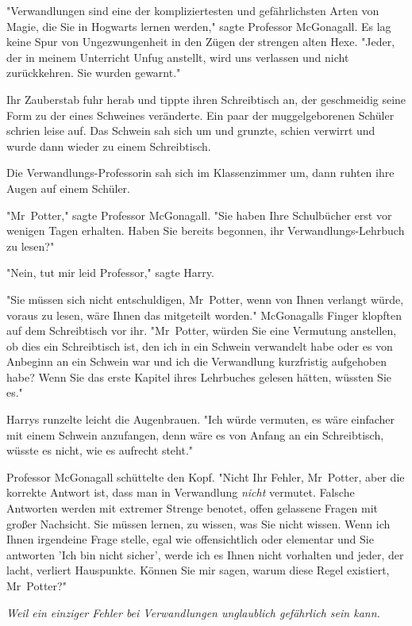 {\later

"Verwandlungen sind eine der kompliziertesten und gefährlichsten Arten von Magie, die Sie in Hogwarts lernen werden," sagte Professor McGonagall. Es lag keine Spur von Ungezwungenheit in den Zügen der strengen alten Hexe. "Jeder, der in meinem Unterricht Unfug anstellt, wird uns verlassen und nicht zurückkehren. Sie wurden gewarnt."

Ihr Zauberstab fuhr herab und tippte ihren Schreibtisch an, der geschmeidig seine Form zu der eines Schweines veränderte. Ein paar der muggelgeborenen Schüler schrien leise auf. Das Schwein sah sich um und grunzte, schien verwirrt und wurde dann wieder zu einem Schreibtisch.

Die Verwandlungs-Professorin sah sich im Klassenzimmer um, dann ruhten ihre Augen auf einem Schüler.

"Mr~Potter," sagte Professor McGonagall. "Sie haben Ihre Schulbücher erst vor wenigen Tagen erhalten. Haben Sie bereits begonnen, ihr Verwandlungs-Lehrbuch zu lesen?"

"Nein, tut mir leid Professor," sagte Harry.

"Sie müssen sich nicht entschuldigen, Mr~Potter, wenn von Ihnen verlangt würde, voraus zu lesen, wäre Ihnen das mitgeteilt worden." McGonagalls Finger klopften auf dem Schreibtisch vor ihr. "Mr~Potter, würden Sie eine Vermutung anstellen, ob dies ein Schreibtisch ist, den ich in ein Schwein verwandelt habe oder es von Anbeginn an ein Schwein war und ich die Verwandlung kurzfristig aufgehoben habe? Wenn Sie das erste Kapitel ihres Lehrbuches gelesen hätten, wüssten Sie es."

Harrys runzelte leicht die Augenbrauen. "Ich würde vermuten, es wäre einfacher mit einem Schwein anzufangen, denn wäre es von Anfang an ein Schreibtisch, wüsste es nicht, wie es aufrecht steht."

Professor McGonagall schüttelte den Kopf. "Nicht Ihr Fehler, Mr~Potter, aber die korrekte Antwort ist, dass man in Verwandlung \emph{nicht} vermutet. Falsche Antworten werden mit extremer Strenge benotet, offen gelassene Fragen mit großer Nachsicht. Sie müssen lernen, zu wissen, was Sie nicht wissen. Wenn ich Ihnen irgendeine Frage stelle, egal wie offensichtlich oder elementar und Sie antworten 'Ich bin nicht sicher', werde ich es Ihnen nicht vorhalten und jeder, der lacht, verliert Hauspunkte. Können Sie mir sagen, warum diese Regel existiert, Mr~Potter?"

\emph{Weil ein einziger Fehler bei Verwandlungen unglaublich gefährlich sein kann.}

}
